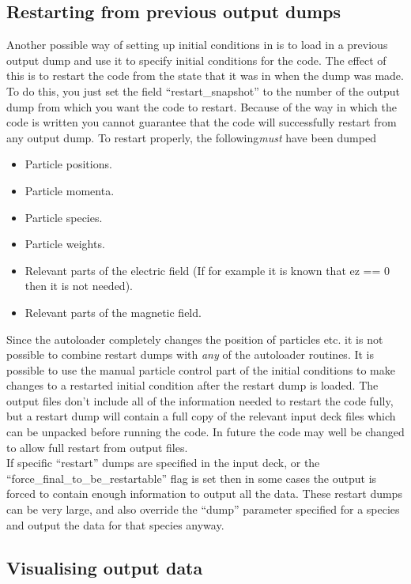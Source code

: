 \documentclass[12pt,a4paper]{article}
\newcommand{\EPOCH}{{\color{warwickdark}\fontfamily{phv}\selectfont{EPOCH}}}
\begin{document}
\subsection{Restarting {\EPOCH} from previous output dumps}
Another possible way of setting up initial conditions in {\EPOCH} is to load in
a previous output dump and use it to specify initial conditions for the
code. The effect of this is to restart the code from the state that it was in
when the dump was made. To do this, you just
set the field ``restart\_snapshot'' to
the number of the output dump from which you want the code to restart. Because
of the way in which the code is written you cannot guarantee that the code will
successfully restart from any output dump. To restart properly, the
following{\it must} have been dumped
\begin{itemize}
\item Particle positions.
\item Particle momenta.
\item Particle species.
\item Particle weights.
\item Relevant parts of the electric field (If for example it is known that ez
  == 0 then it is not needed).
\item Relevant parts of the magnetic field.
\end{itemize}
Since the autoloader completely changes the position of particles etc. it is
not possible to combine restart dumps with {\it any} of the autoloader
routines. It is possible to use the manual particle control part of the
initial conditions to make changes to a restarted initial condition after the
restart dump is loaded. The output files don't include all of the information
needed to restart the code fully, but a restart dump will contain a full copy
of the relevant input deck files which can be unpacked before running the
code. In future the code may well be changed to allow full restart from
output files.\\

If specific ``restart'' dumps are specified in the input deck, or the
``force\_final\_to\_be\_restartable'' flag is set then in some cases the
output is forced to contain enough information to output all the data. These
restart dumps can be very large, and also override the ``dump'' parameter
specified for a species and output the data for that species anyway.

\subsection{Visualising {\EPOCH} output data}
\end{document}
